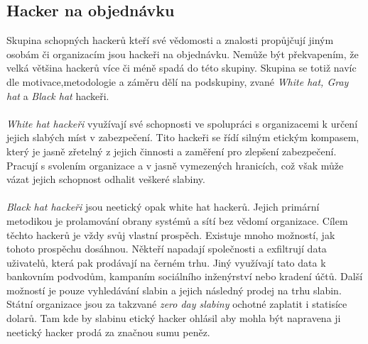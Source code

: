 \subsection{Hacker na objednávku}
Skupina schopných hackerů kteří své vědomosti a znalosti propůjčují jiným osobám či organizacím jsou hackeři na objednávku.
Nemůže být překvapením, že velká většina hackerů více či méně spadá do této skupiny.
Skupina se totiž navíc dle motivace,metodologie a záměru dělí na podskupiny, zvané \textit{White hat, Gray hat} a \textit{Black hat} hackeři.

\paragraph{}
\textit{White hat hackeři} využívají své schopnosti ve spolupráci s organizacemi k určení jejich slabých míst v zabezpečení.
Tito hackeři se řídí silným etickým kompasem, který je jasně zřetelný z jejich činnosti a zaměření pro zlepšení zabezpečení.
Pracují s svolením organizace a v jasně vymezených hranicích, což však může vázat jejich schopnost odhalit veškeré slabiny.

\paragraph{}
\textit{Black hat hackeři} jsou neetický opak white hat hackerů.
Jejich primární metodikou je prolamování obrany systémů a sítí bez vědomí organizace.
Cílem těchto hackerů je vždy svůj vlastní prospěch.
Existuje mnoho možností, jak tohoto prospěchu dosáhnou.
Někteří napadají společnosti a exfiltrují data uživatelů, která pak prodávají na černém trhu.
Jiný využívají tato data k bankovním podvodům, kampaním sociálního inženýrství nebo kradení účtů.
Další možností je pouze vyhledávání slabin a jejich následný prodej na trhu slabin.
Státní organizace jsou za takzvané \textit{zero day slabiny} ochotné zaplatit i statisíce dolarů\cite{world_end_2021}.
Tam kde by slabinu etický hacker ohlásil aby mohla být napravena ji neetický hacker prodá za značnou sumu peněz.

